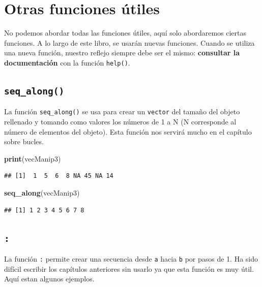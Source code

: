 \documentclass[]{book}
\newenvironment{Shaded}{\begin{snugshade}}{\end{snugshade}}
\newcommand{\KeywordTok}[1]{\textcolor[rgb]{0.13,0.29,0.53}{\textbf{#1}}}
\newcommand{\NormalTok}[1]{#1}
\begin{document}
\section{Otras funciones útiles}\label{otras-funciones-utiles}

No podemos abordar todas las funciones útiles, aquí solo abordaremos
ciertas funciones. A lo largo de este libro, se usarán nuevas funciones.
Cuando se utiliza una nueva función, nuestro reflejo siempre debe ser el
mismo: \textbf{consultar la documentación} con la función
\texttt{help()}.

\subsection{\texorpdfstring{\texttt{seq\_along()}}{seq\_along()}}\label{l015seqalong}

La función \texttt{seq\_along()} se usa para crear un \texttt{vector}
del tamaño del objeto rellenado y tomando como valores los números de 1
a N (N corresponde al número de elementos del objeto). Esta función nos
servirá mucho en el capítulo sobre bucles.

\begin{Shaded}
\begin{Highlighting}[]
\KeywordTok{print}\NormalTok{(vecManip3)}
\end{Highlighting}
\end{Shaded}

\begin{verbatim}
## [1]  1  5  6  8 NA 45 NA 14
\end{verbatim}

\begin{Shaded}
\begin{Highlighting}[]
\KeywordTok{seq_along}\NormalTok{(vecManip3)}
\end{Highlighting}
\end{Shaded}

\begin{verbatim}
## [1] 1 2 3 4 5 6 7 8
\end{verbatim}

\subsection{\texorpdfstring{\texttt{:}}{:}}\label{l0152points}

La función \texttt{:} permite crear una secuencia desde \texttt{a} hacia
\texttt{b} por pasos de 1. Ha sido difícil escribir los capítulos
anteriores sin usarlo ya que esta función es muy útil. Aquí estan
algunos ejemplos.
\end{document}
